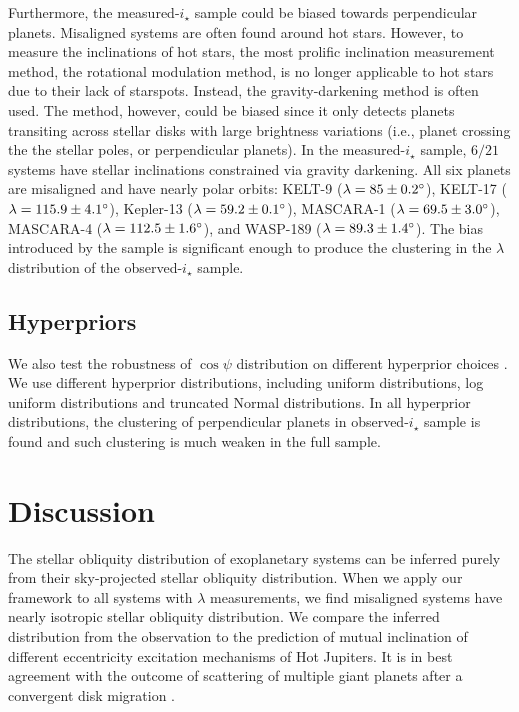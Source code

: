 \documentclass[twocolumn,times]{aastex631}
\begin{document}
Furthermore, the measured-$i_\star$ sample could be biased towards perpendicular planets. Misaligned systems are often found around hot stars. However, to measure the inclinations of hot stars, the most prolific inclination measurement method, the rotational modulation method, is no longer applicable to hot stars due to their lack of starspots. Instead, the gravity-darkening method is often used. The method, however, could be biased since it only detects planets transiting across stellar disks with large brightness variations (i.e., planet crossing the the stellar poles, or perpendicular planets). In the measured-$i_\star$ sample, $6/21$ systems have stellar inclinations constrained via gravity darkening. All six planets are misaligned and have nearly polar orbits: 
KELT-9 ($\lambda = 85 \pm 0.2\mbox{$^\circ$}$),
KELT-17 ($\lambda = 115.9 \pm 4.1 \mbox{$^\circ$}$), 
Kepler-13 ($\lambda = 59.2 \pm 0.1 \mbox{$^\circ$}$), 
MASCARA-1 ($\lambda = 69.5 \pm 3.0 \mbox{$^\circ$}$),
MASCARA-4 ($\lambda = 112.5 \pm 1.6 \mbox{$^\circ$}$), 
and WASP-189 ($\lambda = 89.3 \pm 1.4 \mbox{$^\circ$}$).
The bias introduced by the sample is significant enough to produce the clustering in the $\lambda$ distribution of the observed-$i_\star$ sample.

\subsection{Hyperpriors}
We also test the robustness of $\cos{\psi}$ distribution on different hyperprior choices \citep[see a nice summary in][]{Nagpal22}. We use different hyperprior distributions, including uniform distributions, log uniform distributions and truncated Normal distributions. In all hyperprior distributions, the clustering of perpendicular planets in observed-$i_\star$ sample is found and such clustering is much weaken in the full sample.

\section{Discussion} \label{sec:discussion}
The stellar obliquity distribution of exoplanetary systems can be inferred purely from their sky-projected stellar obliquity distribution. When we apply our framework to all systems with $\lambda$ measurements, we find misaligned systems have nearly isotropic stellar obliquity distribution. We compare the inferred distribution from the observation to the prediction of mutual inclination of different eccentricity excitation mechanisms of Hot Jupiters. It is in best agreement with the outcome of scattering of multiple giant planets after a convergent disk migration \citep{Beague12}.


\end{document}
